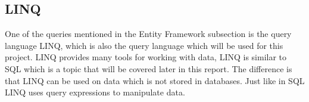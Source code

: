 \subsection{LINQ}
One of the queries mentioned in the Entity Framework subsection is the query language LINQ, which is also the query language which will be used for this project. LINQ provides many tools for working with data, LINQ is similar to SQL which is a topic that will be covered later in this report. The difference is that LINQ can be used on data which is not stored in databases. Just like in SQL LINQ uses query expressions to manipulate data. 